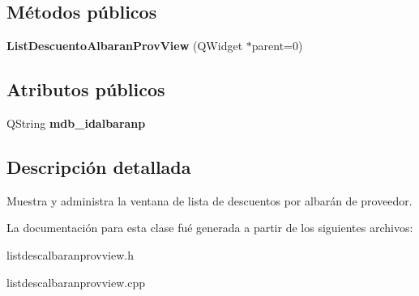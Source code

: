 \subsection*{M\'{e}todos p\'{u}blicos}
\begin{CompactItemize}
\item 
{\bf List\-Descuento\-Albaran\-Prov\-View} (QWidget $\ast$parent=0)\label{classListDescuentoAlbaranProvView_a0}

\end{CompactItemize}
\subsection*{Atributos p\'{u}blicos}
\begin{CompactItemize}
\item 
QString {\bf mdb\_\-idalbaranp}\label{classListDescuentoAlbaranProvView_o0}

\end{CompactItemize}


\subsection{Descripci\'{o}n detallada}
Muestra y administra la ventana de lista de descuentos por albar\'{a}n de proveedor. 



La documentaci\'{o}n para esta clase fu\'{e} generada a partir de los siguientes archivos:\begin{CompactItemize}
\item 
listdescalbaranprovview.h\item 
listdescalbaranprovview.cpp\end{CompactItemize}
